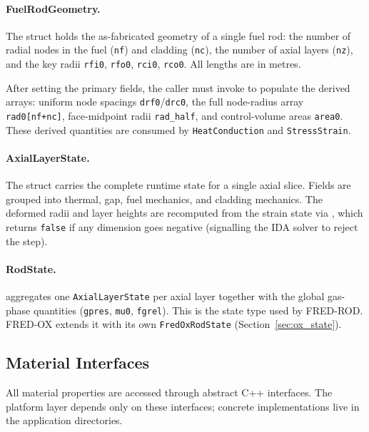 \documentclass[11pt,a4paper]{article}
\begin{document}
\paragraph{FuelRodGeometry.}
The struct  holds the as-fabricated geometry of a single fuel rod: the number of radial nodes in the fuel (\texttt{nf}) and cladding (\texttt{nc}), the number of axial layers (\texttt{nz}), and the key radii \texttt{rfi0}, \texttt{rfo0}, \texttt{rci0}, \texttt{rco0}.  All lengths are in metres.

After setting the primary fields, the caller must invoke  to populate the derived arrays: uniform node spacings \texttt{drf0}/\texttt{drc0}, the full node-radius array \texttt{rad0[nf+nc]}, face-midpoint radii \texttt{rad\_half}, and control-volume areas \texttt{area0}.  These derived quantities are consumed by \texttt{HeatConduction} and \texttt{StressStrain}.

\paragraph{AxialLayerState.}
The struct  carries the complete runtime state for a single axial slice.  Fields are grouped into thermal, gap, fuel mechanics, and cladding mechanics. The deformed radii and layer heights are recomputed from the strain state via , which returns \texttt{false} if any dimension goes negative (signalling the IDA solver to reject the step).

\paragraph{RodState.}
 aggregates one \texttt{AxialLayerState} per axial layer together with the global gas-phase quantities (\texttt{gpres}, \texttt{mu0}, \texttt{fgrel}).  This is the state type used by FRED-ROD.  FRED-OX extends it with its own \texttt{FredOxRodState} (Section~\ref{sec:ox_state}).

\subsection{Material Interfaces}
\label{sec:materials}

All material properties are accessed through abstract C++ interfaces.  The platform layer depends only on these interfaces; concrete implementations live in the application directories.
\end{document}
